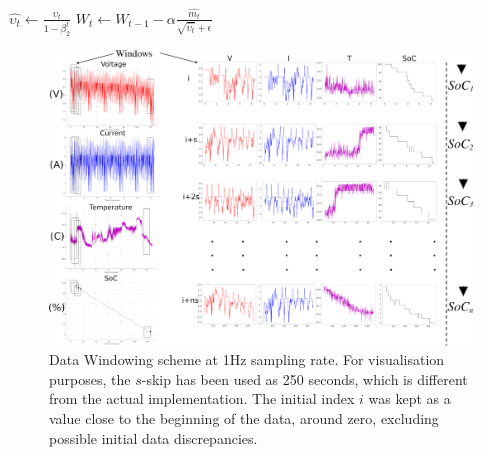 {\begin{algorithm}
\begin{algorithmic}[1]
        \STATE $\hat{\upsilon_t} \gets \frac{\upsilon_t}{1-\beta^t_2} $ 
        \STATE $W_t \gets W_{t-1}- \alpha \frac{\hat{m_t}}{\sqrt{\hat{\upsilon_t}}+\epsilon} $ 
        \ENDWHILE
    \end{algorithmic}
    \label{alg:copyAdam}
\end{algorithm}
\begin{table}[htbp]
    \renewcommand{\arraystretch}{1.3}
    \caption{Optimiser Hyper-Parameters}
    \centering
    \label{tab:newM-params}
\end{table}
}
\begin{landscape}
    \begin{figure}[t]
        \centering
        \includegraphics[width=\linewidth]{II_Body/images/Windowing4f-A3.jpg}
        \caption{Data Windowing scheme at 1Hz sampling rate. For visualisation purposes, the $s$-skip has been used as 250 seconds, which is different from the actual implementation. The initial index $i$ was kept as a value close to the beginning of the data, around zero, excluding possible initial data discrepancies.}
        \label{fig:Windowing}
    \end{figure}
\end{landscape}